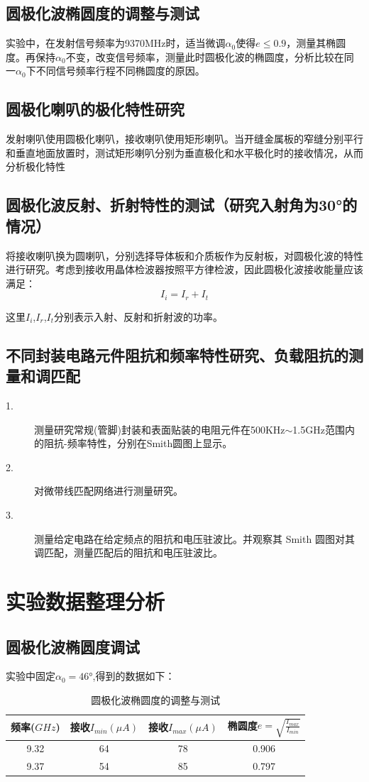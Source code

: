 \documentclass[UTF8]{ctexart}
\begin{document}
\subsection{圆极化波椭圆度的调整与测试}
实验中，在发射信号频率为9370MHz时，适当微调$\alpha_0$使得$e\le0.9$，测量其椭圆度。再保持$\alpha_0$不变，改变信号频率，测量此时圆极化波的椭圆度，分析比较在同一$\alpha_0$下不同信号频率行程不同椭圆度的原因。

\subsection{圆极化喇叭的极化特性研究}
发射喇叭使用圆极化喇叭，接收喇叭使用矩形喇叭。当开缝金属板的窄缝分别平行和垂直地面放置时，测试矩形喇叭分别为垂直极化和水平极化时的接收情况，从而分析极化特性

\subsection{圆极化波反射、折射特性的测试（研究入射角为30°的情况）}
将接收喇叭换为圆喇叭，分别选择导体板和介质板作为反射板，对圆极化波的特性进行研究。考虑到接收用晶体检波器按照平方律检波，因此圆极化波接收能量应该满足：
$$
I_i=I_r+I_t
$$

这里$I_i$,$I_r$,$I_t$分别表示入射、反射和折射波的功率。




\subsection{不同封装电路元件阻抗和频率特性研究、负载阻抗的测量和调匹配}
\begin{description}
    \item[1.] 测量研究常规(管脚)封装和表面贴装的电阻元件在500KHz$\sim$1.5GHz范围内的阻抗-频率特性，分别在Smith圆图上显示。
    \item[2.] 对微带线匹配网络进行测量研究。
    \item[3.] 测量给定电路在给定频点的阻抗和电压驻波比。并观察其 Smith 圆图对其调匹配，测量匹配后的阻抗和电压驻波比。
\end{description}
\section{实验数据整理分析}

\subsection{圆极化波椭圆度调试}
实验中固定$\alpha_0=46°$,得到的数据如下：
\begin{table}[H]
    \centering
    \renewcommand{\arraystretch}{1.5}
    \caption{圆极化波椭圆度的调整与测试}
    \begin{tabular}{|c|c|c|c|}\hline
        频率($GHz$)&接收$I_{min}(\mu A)$&接收$I_{max}(\mu A)$&椭圆度$e=\sqrt{\frac{I_{max}}{I_{min}}}$\\\hline
        9.32&64&78&0.906\\\hline
        9.37&54&85&0.797\\\hline
    \end{tabular}
\end{table}
\end{document}
